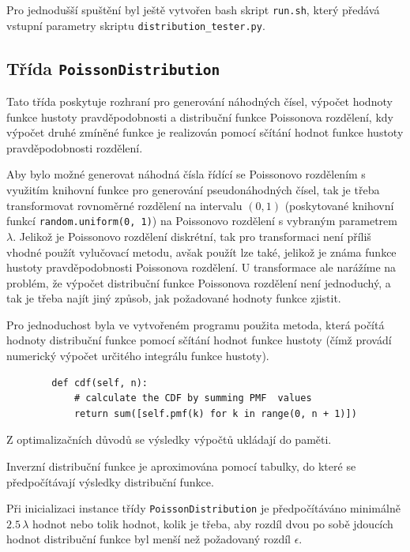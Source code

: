 \documentclass[12pt, a4paper]{article}
\begin{document}
    Pro jednodušší spuštění byl ještě vytvořen bash skript \texttt{run.sh}, který předává vstupní parametry skriptu
    \texttt{distribution\_tester.py}.

    \subsection{Třída \texttt{PoissonDistribution}}

    Tato třída poskytuje rozhraní pro generování náhodných čísel, výpočet hodnoty funkce hustoty pravděpodobnosti a distribuční
    funkce Poissonova rozdělení, kdy výpočet druhé zmíněné funkce je realizován pomocí sčítání hodnot funkce hustoty
    pravděpodobnosti rozdělení.

    Aby bylo možné generovat náhodná čísla řídící se Poissonovo rozdělením s využitím knihovní funkce pro generování
    pseudonáhodných čísel, tak je třeba transformovat rovnoměrné rozdělení na intervalu $(0, 1)$ (poskytované knihovní funkcí
    \texttt{random.uniform(0, 1)}) na Poissonovo rozdělení s vybraným parametrem $\lambda$.
    Jelikož je Poissonovo rozdělení diskrétní, tak pro transformaci není příliš vhodné použít vylučovací metodu, avšak
    použít lze také, jelikož je známa funkce hustoty pravděpodobnosti Poissonova rozdělení.
    U transformace ale narážíme na problém, že výpočet distribuční funkce Poissonova rozdělení není jednoduchý, a tak je
    třeba najít jiný způsob, jak požadované hodnoty funkce zjistit.

    Pro jednoduchost byla ve vytvořeném programu použita metoda, která počítá hodnoty distribuční funkce pomocí
    sčítání hodnot funkce hustoty (čímž provádí numerický výpočet určitého integrálu funkce hustoty).

    \begin{lstlisting}
        def cdf(self, n):
            # calculate the CDF by summing PMF  values
            return sum([self.pmf(k) for k in range(0, n + 1)])
    \end{lstlisting}

    \noindent Z optimalizačních důvodů se výsledky výpočtů ukládají do paměti.

    Inverzní distribuční funkce je aproximována pomocí tabulky, do které se předpočítávají výsledky distribuční funkce.

    Při inicializaci instance třídy \texttt{PoissonDistribution} je předpočítáváno minimálně $2.5\, \lambda$ hodnot nebo tolik
    hodnot, kolik je třeba, aby rozdíl dvou po sobě jdoucích hodnot distribuční funkce byl menší než požadovaný rozdíl $\epsilon$.
\end{document}
